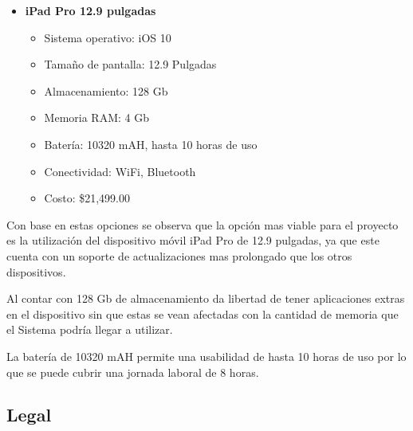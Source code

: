 \begin{itemize}
    \item \textbf{iPad Pro 12.9 pulgadas} \cite{ipad}
    \begin{itemize}
        \item Sistema operativo: iOS 10
        \item Tamaño de pantalla: 12.9 Pulgadas
        \item Almacenamiento: 128 Gb
        \item Memoria RAM: 4 Gb
        \item Batería: 10320 mAH, hasta 10 horas de uso
        \item Conectividad: WiFi, Bluetooth
        \item Costo: \$21,499.00
    \end{itemize}
\end{itemize}

Con base en estas opciones se observa que la opción mas viable para el proyecto es la utilización del dispositivo móvil iPad Pro de 12.9 pulgadas, ya que este cuenta con un soporte de actualizaciones mas prolongado que los otros dispositivos.


Al contar con 128 Gb de almacenamiento da libertad de tener aplicaciones extras en el dispositivo sin que estas se vean afectadas con la cantidad de memoria que el Sistema podría llegar a utilizar.

La batería de 10320 mAH permite una usabilidad de hasta 10 horas de uso por lo que se puede cubrir una jornada laboral de 8 horas.

\subsection{Legal}



